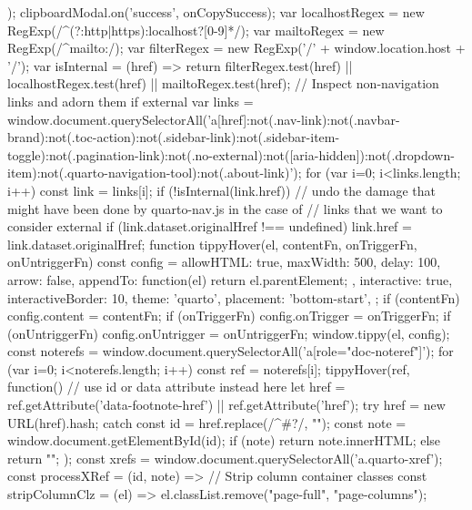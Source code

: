 {{{      });
      clipboardModal.on('success', onCopySuccess);
    }
      var localhostRegex = new RegExp(/^(?:http|https):\/\/localhost\:?[0-9]*\//);
      var mailtoRegex = new RegExp(/^mailto:/);
        var filterRegex = new RegExp('/' + window.location.host + '/');
      var isInternal = (href) => {
          return filterRegex.test(href) || localhostRegex.test(href) || mailtoRegex.test(href);
      }
      // Inspect non-navigation links and adorn them if external
     var links = window.document.querySelectorAll('a[href]:not(.nav-link):not(.navbar-brand):not(.toc-action):not(.sidebar-link):not(.sidebar-item-toggle):not(.pagination-link):not(.no-external):not([aria-hidden]):not(.dropdown-item):not(.quarto-navigation-tool):not(.about-link)');
      for (var i=0; i<links.length; i++) {
        const link = links[i];
        if (!isInternal(link.href)) {
          // undo the damage that might have been done by quarto-nav.js in the case of
          // links that we want to consider external
          if (link.dataset.originalHref !== undefined) {
            link.href = link.dataset.originalHref;
          }
        }
      }
    function tippyHover(el, contentFn, onTriggerFn, onUntriggerFn) {
      const config = {
        allowHTML: true,
        maxWidth: 500,
        delay: 100,
        arrow: false,
        appendTo: function(el) {
            return el.parentElement;
        },
        interactive: true,
        interactiveBorder: 10,
        theme: 'quarto',
        placement: 'bottom-start',
      };
      if (contentFn) {
        config.content = contentFn;
      }
      if (onTriggerFn) {
        config.onTrigger = onTriggerFn;
      }
      if (onUntriggerFn) {
        config.onUntrigger = onUntriggerFn;
      }
      window.tippy(el, config); 
    }
    const noterefs = window.document.querySelectorAll('a[role="doc-noteref"]');
    for (var i=0; i<noterefs.length; i++) {
      const ref = noterefs[i];
      tippyHover(ref, function() {
        // use id or data attribute instead here
        let href = ref.getAttribute('data-footnote-href') || ref.getAttribute('href');
        try { href = new URL(href).hash; } catch {}
        const id = href.replace(/^#\/?/, "");
        const note = window.document.getElementById(id);
        if (note) {
          return note.innerHTML;
        } else {
          return "";
        }
      });
    }
    const xrefs = window.document.querySelectorAll('a.quarto-xref');
    const processXRef = (id, note) => {
      // Strip column container classes
      const stripColumnClz = (el) => {
        el.classList.remove("page-full", "page-columns");
}}}
